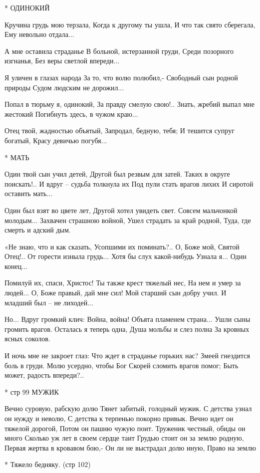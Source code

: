 * ОДИНОКИЙ

Кручина грудь мою терзала,
Когда к другому ты ушла,
И что так свято сберегала,
Ему невольно отдала...

А мне оставила страданье
В больной, истерзанной груди,
Среди позорного изгнанья,
Без веры светлой впереди...

Я уличен в глазах народа
За то, что волю полюбил,-
Свободный сын родной природы
Судом людским не дорожил...

Попал в тюрьму я, одинокий,
За правду смелую свою!..
Знать, жребий выпал мне жестокий
Погибнуть здесь, в чужом краю...

Отец твой, жадностью объятый,
Запродал, бедную, тебя;
И тешится супруг богатый,
Красу девичью погубя...


* МАТЬ

Один твой сын учил детей,
Другой был резвым для затей.
Таких в округе поискать!..
И вдруг – судьба толкнула их
Под пули стать врагов лихих
И сиротой оставить мать...


Один был взят во цвете лет,
Другой хотел увидеть свет.
Совсем мальчонкой молодым...
Захвачен страшною войной,
Ушел страдать за край родной,
Туда, где смерть и адский дым.

«Не знаю, что и как сказать,
Усопшими их поминать?..
О, Боже мой, Святой Отец!..
От горести изныла грудь...
Хотя бы слух какой-нибудь
Узнала я... Один конец...

Помилуй их, спаси, Христос!
Ты также крест тяжелый нес,
На нем и умер за людей...
О, Боже правый, дай мне сил!
Мой старший сын добру учил.
И младший был – не лиходей...

Но... Вдруг громкий клич: Война, война!
Объята пламенем страна...
Ушли сыны громить врагов.
Осталась я теперь одна,
Душа мольбы и слез полна
За кровных ясных соколов.

И ночь мне не закроет глаз:
Что ждет в страданье горьких нас?
Змеей гнездится боль в груди.
Молю усердно, чтобы Бог
Скорей сломить врагов помог;
Быть может, радость впереди?..


* стр 99  МУЖИК

Вечно суровую, рабскую долю
Тянет забитый, голодный мужик.
С детства узнал он нужду и неволю,
С детства к терпенью покорно привык.
Вечно идет он тяжелой дорогой,
Потом он пашню чужую поит.
Труженик честный, обиды он много
Сколько уж лет в своем сердце таит
Грудью стоит он за землю родную,
Первая жертва в кровавом бою,-
Он ли не выстрадал долю иную,
Право на землю


* Тяжело бедняку. (стр 102)


